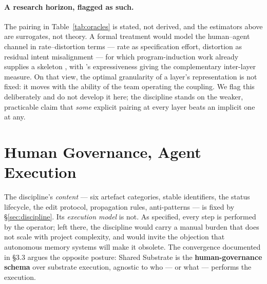 \documentclass[11pt,a4paper,twocolumn]{article}
\begin{document}
\paragraph{A research horizon, flagged as such.} The pairing in
Table~\ref{tab:oracles} is stated, not derived, and the
estimators above are surrogates, not theory. A formal treatment
would model the human--agent channel in rate--distortion terms ---
rate as specification effort, distortion as residual intent
misalignment --- for which program-induction work already supplies
a skeleton \citep{zhou2024ratedistortion}, with
\citet{felleisen1991expressive}'s expressiveness giving the
complementary inter-layer measure. On that view, the optimal
granularity of a layer's representation is not fixed: it moves
with the ability of the team operating the coupling. We flag this
deliberately and do not develop it here; the discipline stands on
the weaker, practicable claim that \emph{some} explicit pairing at
every layer beats an implicit one at any.

\section{Human Governance, Agent Execution}
\label{sec:governance}

The discipline's \emph{content} --- six artefact categories,
stable identifiers, the status lifecycle, the edit protocol,
propagation rules, anti-patterns --- is fixed by
\S\ref{sec:discipline}. Its \emph{execution model} is not. As
specified, every step is performed by the operator; left
there, the discipline would carry a manual burden that does not
scale with project complexity, and would invite the objection
that autonomous memory systems will make it obsolete. The
convergence documented in \S3.3 argues the opposite posture:
Shared Substrate is the \textbf{human-governance schema} over
substrate execution, agnostic to who --- or what --- performs the
execution.
\end{document}
